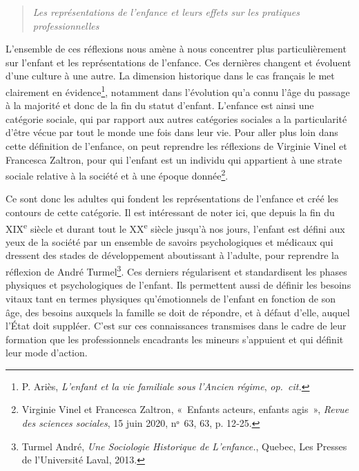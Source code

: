 \documentclass[
  12,
  a4paper,
]{report}
\begin{document}
\begin{quote}
\emph{Les représentations de l'enfance et leurs effets sur les pratiques
professionnelles}
\end{quote}

L'ensemble de ces réflexions nous amène à nous concentrer plus
particulièrement sur l'enfant et les représentations de l'enfance. Ces
dernières changent et évoluent d'une culture à une autre. La dimension
historique dans le cas français le met clairement en
évidence\footnote{P. Ariès, \emph{L'enfant et la vie familiale sous
  l'Ancien régime}, \emph{op.~cit.}}, notamment dans l'évolution qu'a
connu l'âge du passage à la majorité et donc de la fin du statut
d'enfant. L'enfance est ainsi une catégorie sociale, qui par rapport aux
autres catégories sociales a la particularité d'être vécue par tout le
monde une fois dans leur vie. Pour aller plus loin dans cette définition
de l'enfance, on peut reprendre les réflexions de Virginie Vinel et
Francesca Zaltron, pour qui l'enfant est un individu qui appartient à
une strate sociale relative à la société et à une époque
donnée\footnote{Virginie Vinel et Francesca Zaltron, {«~Enfants acteurs,
  enfants agis~»}, \emph{Revue des sciences sociales}, 15 juin 2020,
  nᵒ~63, 63, p. 12‑25.}.

Ce sont donc les adultes qui fondent les représentations de l'enfance et
créé les contours de cette catégorie. Il est intéressant de noter ici,
que depuis la fin du XIX\textsuperscript{e} siècle et durant tout le
XX\textsuperscript{e} siècle jusqu'à nos jours, l'enfant est défini aux
yeux de la société par un ensemble de savoirs psychologiques et médicaux
qui dressent des stades de développement aboutissant à l'adulte, pour
reprendre la réflexion de André Turmel\footnote{Turmel André, \emph{Une
  Sociologie Historique de L'enfance.}, {Quebec}, {Les Presses de
  l'Université Laval}, 2013.}. Ces derniers régularisent et
standardisent les phases physiques et psychologiques de l'enfant. Ils
permettent aussi de définir les besoins vitaux tant en termes physiques
qu'émotionnels de l'enfant en fonction de son âge, des besoins auxquels
la famille se doit de répondre, et à défaut d'elle, auquel l'État doit
suppléer. C'est sur ces connaissances transmises dans le cadre de leur
formation que les professionnels encadrants les mineurs s'appuient et
qui définit leur mode d'action.
\end{document}
